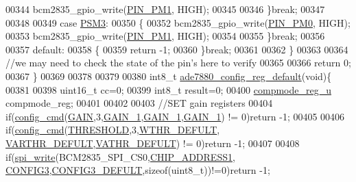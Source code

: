 \begin{DoxyCode}
00344                      bcm2835\_gpio\_write(\hyperlink{a00039_a93e6f13f663a3ca8bcf6efe2022c9b78}{PIN\_PM1}, HIGH);
00345                  
00346                 \}\textcolor{keywordflow}{break};
00347                 
00348 
00349                  \textcolor{keywordflow}{case}  \hyperlink{a00037_aaaecd8504625316f84bd76accbcc42f0}{PSM3}:
00350                 \{
00352                      bcm2835\_gpio\_write(\hyperlink{a00039_aef7884a448449013ba1f8b46b8df5c05}{PIN\_PM0}, HIGH);     
00353                      bcm2835\_gpio\_write(\hyperlink{a00039_a93e6f13f663a3ca8bcf6efe2022c9b78}{PIN\_PM1}, HIGH);
00354                       
00355                 \}\textcolor{keywordflow}{break};
00356                 
00357                 \textcolor{keywordflow}{default}:
00358                 \{    
00359                    \textcolor{keywordflow}{return} -1;
00360                 \}\textcolor{keywordflow}{break};
00361      
00362         \}
00363      
00364      \textcolor{comment}{//we may need to check the state of the pin's here to verify }
00365             
00366 \textcolor{keywordflow}{return} 0;   
00367 \}
00369 
00378 
00379 
00380 int8\_t \hyperlink{a00005_ga7782772c18e6ea515dcd28dcaedd0f06}{ade7880\_config\_reg\_default}(\textcolor{keywordtype}{void})\{ 
00381  
00398     uint16\_t cc=0;
00399     int8\_t result=0;
00400     \hyperlink{a00021}{compmode\_reg\_u} compmode\_reg;
00401 
00402     
00403             \textcolor{comment}{//SET gain registers }
00404             \textcolor{keywordflow}{if}(\hyperlink{a00005_ga369ee0e8379941cbc2c79b90ec3292da}{config\_cmd}(\hyperlink{a00036_a8c8f27b35dfa40ccf31c1ee31479a31c}{GAIN},3,\hyperlink{a00036_a3c686a06cc9d837e73b259bcc054217e}{GAIN\_1},\hyperlink{a00036_a3c686a06cc9d837e73b259bcc054217e}{GAIN\_1},\hyperlink{a00036_a3c686a06cc9d837e73b259bcc054217e}{GAIN\_1}) != 0)\textcolor{keywordflow}{return} -1;
00405             
00406             \textcolor{keywordflow}{if}(\hyperlink{a00005_ga369ee0e8379941cbc2c79b90ec3292da}{config\_cmd}(\hyperlink{a00043_a4679d8ea8690999a6c6c7c0cb245c879}{THRESHOLD},3,\hyperlink{a00036_a54a78cc890aa0300e82a9de239ebc5a5}{WTHR\_DEFULT},
      \hyperlink{a00036_a105c1723ae41d790579de1a93641abea}{VARTHR\_DEFULT},\hyperlink{a00036_a3ca4a19859a50d3b85939e9b0c145637}{VATHR\_DEFULT}) != 0)\textcolor{keywordflow}{return} -1;
00407             
00408             \textcolor{keywordflow}{if}(\hyperlink{a00007_ga2770219ad8ad1eda1817c0df934b47d0}{spi\_write}(BCM2835\_SPI\_CS0,\hyperlink{a00037_a94de2b046db6e10257ef4481c0a15eaa}{CHIP\_ADDRESS1},
      \hyperlink{a00036_a8d128687074c874210b0c9dada3d8ca7}{CONFIG3},\hyperlink{a00036_a6d4592c2f28292b11885fa8ec3ed0941}{CONFIG3\_DEFULT},\textcolor{keyword}{sizeof}(uint8\_t))!=0)\textcolor{keywordflow}{return} -1; 

\end{DoxyCode}
